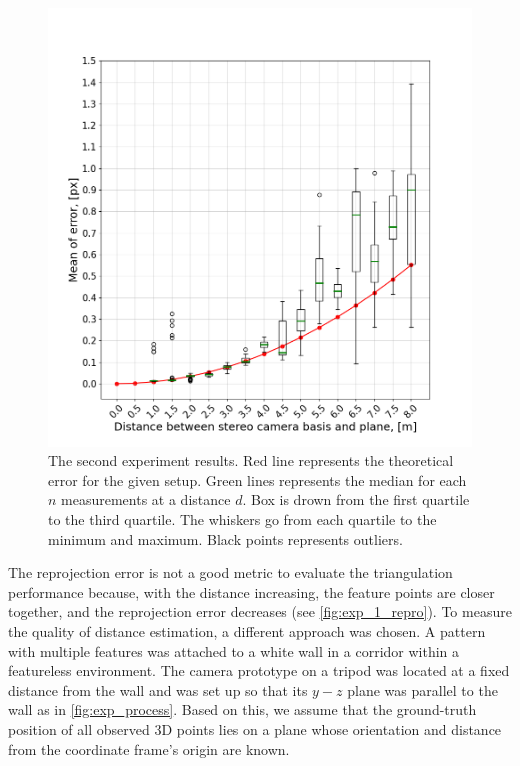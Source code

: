 \begin{figure}[ht]
    \centering
    \includegraphics[width=\textwidth]{graphics/experiment_2_general.png}
  \caption[The second experiment results.]{The second experiment results. Red line represents the theoretical error for the given setup.
  Green lines represents the median for each $n$ measurements at a distance $d$. Box is drown from the first quartile to the third quartile.
  The whiskers go from each quartile to the minimum and maximum.
  Black points represents outliers.}
  \label{fig:exp_2_general}
\end{figure}

The reprojection error is not a good metric to evaluate the triangulation performance because, with the distance increasing, the feature points are closer together, and the reprojection error decreases (see \autoref{fig:exp_1_repro}).
To measure the quality of distance estimation, a different approach was chosen.
A pattern with multiple features was attached to a white wall in a corridor within a featureless environment.
The camera prototype on a tripod was located at a fixed distance from the wall and was set up so that its $y-z$ plane was parallel to the wall as in \autoref{fig:exp_process}.
Based on this, we assume that the ground-truth position of all observed 3D points lies on a plane whose orientation and distance from the coordinate frame's origin are known.

